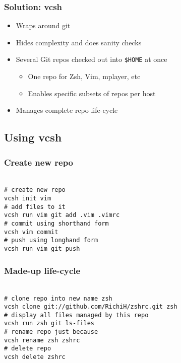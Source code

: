\documentclass[t]{beamer}
\begin{document}
\begin{frame}
	\frametitle{Solution: vcsh}
	\begin{itemize}
		\item Wraps around git
		\item Hides complexity and does sanity checks
			\item Several Git repos checked out into \texttt{\$HOME} at once
		\begin{itemize}
			\item One repo for Zsh, Vim, mplayer, etc
			\item Enables specific subsets of repos per host
		\end{itemize}
		\item Manages complete repo life-cycle
	\end{itemize}
\end{frame}

\subsection{Using vcsh}

\begin{frame}
	\frametitle{Create new repo}
	\texttt{ \\
		\# create new repo \\
		vcsh init vim \\
		\# add files to it \\
		vcsh run vim git add .vim .vimrc \\
		\# commit using shorthand form \\
		vcsh vim commit \\
		\# push using longhand form \\
		vcsh run vim git push
	}
\end{frame}

\begin{frame}
	\frametitle{Made-up life-cycle}
	\texttt{ \\
		\# clone repo into new name zsh \\
		vcsh clone git://github.com/RichiH/zshrc.git zsh \\
		\# display all files managed by this repo \\
		vcsh run zsh git ls-files \\
		\# rename repo just because \\
		vcsh rename zsh zshrc \\
		\# delete repo \\
		vcsh delete zshrc
	}
\end{frame}
\end{document}
